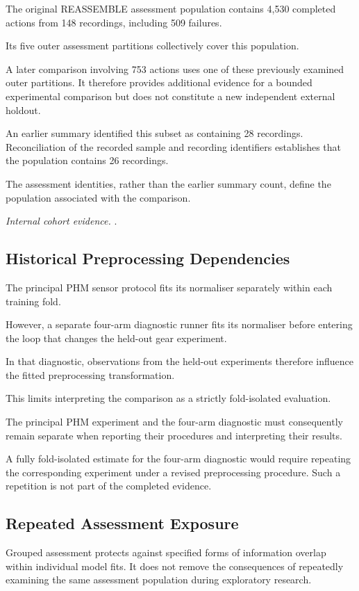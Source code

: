 The original REASSEMBLE assessment population contains 4,530 completed actions from 148 recordings, including 509 failures.

Its five outer assessment partitions collectively cover this population.

A later comparison involving 753 actions uses one of these previously examined outer partitions. It therefore provides additional evidence for a bounded experimental comparison but does not constitute a new independent external holdout.

An earlier summary identified this subset as containing 28 recordings. Reconciliation of the recorded sample and recording identifiers establishes that the population contains 26 recordings.

The assessment identities, rather than the earlier summary count, define the population associated with the comparison.

\noindent\textit{Internal cohort evidence.} .

\subsection{Historical Preprocessing Dependencies}

The principal PHM sensor protocol fits its normaliser separately within each training fold.

However, a separate four-arm diagnostic runner fits its normaliser before entering the loop that changes the held-out gear experiment.

In that diagnostic, observations from the held-out experiments therefore influence the fitted preprocessing transformation.

This limits interpreting the comparison as a strictly fold-isolated evaluation.

The principal PHM experiment and the four-arm diagnostic must consequently remain separate when reporting their procedures and interpreting their results.

A fully fold-isolated estimate for the four-arm diagnostic would require repeating the corresponding experiment under a revised preprocessing procedure. Such a repetition is not part of the completed evidence.

\subsection{Repeated Assessment Exposure}

Grouped assessment protects against specified forms of information overlap within individual model fits. It does not remove the consequences of repeatedly examining the same assessment population during exploratory research.


